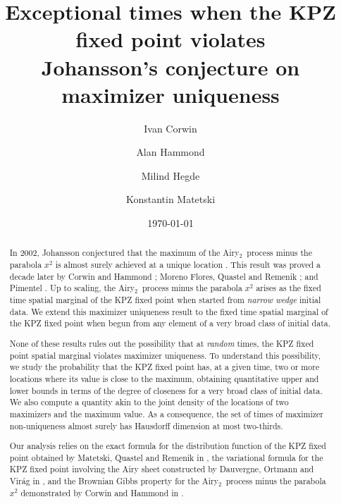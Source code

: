 \documentclass[oneside,final,11pt]{amsart}
\title[Exceptional times when the KPZ fixed point violates Johansson's conjecture]{Exceptional times when the KPZ fixed point violates\\ Johansson's conjecture on maximizer uniqueness}
\date{\today}
\author[I. Corwin]{Ivan Corwin}
\author[A. Hammond]{Alan Hammond}
\author[M. Hegde]{Milind Hegde}
\author[K. Matetski]{Konstantin Matetski}
\theoremstyle{definition}
\newcommand{\fh}{\mathfrak{h}}
\newcommand{\Airy}{Airy$_2$~}
\newcommand{\1}[1]{\mathbf{1}_{#1}}
\newcommand{\km}[1]{\marginnote{\tiny{\color{red}[KM: #1]}}}
\newcommand{\mh}[1]{\marginnote{\tiny{\color{blue}[MH: #1]}}}
\newcommand{\green}[1]{{\color{green!65!black}#1}}
\numberwithin{equation}{section}
\begin{document}
\begin{abstract}
In 2002, Johansson conjectured that the maximum of the \Airy process minus the parabola $x^2$ is almost surely achieved at a unique location \cite[Conjecture 1.5]{JohanssonPoly}. This result was proved a decade later by Corwin and Hammond \cite[Theorem 4.3]{BrownianGibbs}; Moreno Flores, Quastel and Remenik \cite{MaxOfAiry2}; and Pimentel \cite{pimentel_2014}. Up to scaling, the \Airy process minus the parabola $x^2$ arises as the fixed time spatial marginal of the KPZ fixed point when started from  {\it narrow wedge} initial data. We extend this maximizer uniqueness result to the fixed time spatial marginal of the KPZ fixed point when begun from any element of a very broad class of initial data.
%
%

None of these results rules out the possibility that at {\it random} times, the KPZ fixed point spatial marginal violates maximizer uniqueness. To understand this possibility, we study the probability that the KPZ fixed point has, at a given time, two or more locations where its value is close to the maximum, obtaining quantitative upper and lower bounds in terms of the degree of closeness for a very broad class of initial data. We also compute a quantity akin to the joint density of the locations of two maximizers and the maximum value. %
As a consequence, the set of times of maximizer non-uniqueness almost surely has Hausdorff dimension at most two-thirds. %

Our analysis relies on the exact formula for the distribution function of the KPZ fixed point obtained by Matetski, Quastel and Remenik in \cite{fixedpt}, the variational formula for the KPZ fixed point involving the Airy sheet constructed by Dauvergne, Ortmann and Vir\'ag in \cite{Landscape}, and the Brownian Gibbs property for the \Airy process minus the parabola $x^2$ demonstrated by Corwin and Hammond in \cite{BrownianGibbs}. 


\end{abstract}
\end{document}
